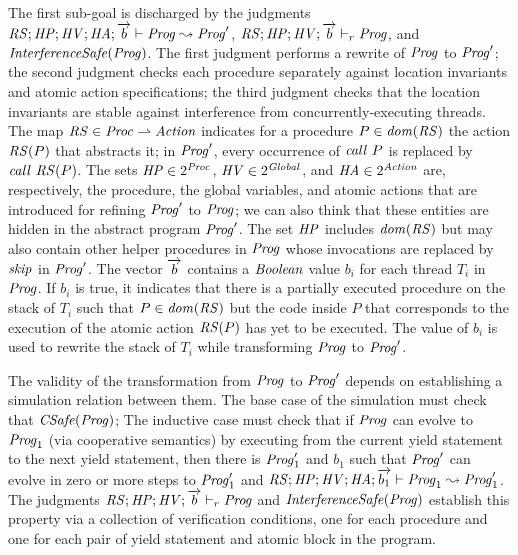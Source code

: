 The first sub-goal is discharged by 
the judgments $\mathit{RS};\mathit{HP};\mathit{HV};\mathit{HA};\overrightarrow{b} \vdash \mathit{Prog} \leadsto \mathit{Prog}'$,
$\mathit{RS};\mathit{HP};\mathit{HV};\overrightarrow{b} \vdash_r \mathit{Prog}$, and $\mathit{InterferenceSafe}(\mathit{Prog})$.
The first judgment performs a rewrite of $\mathit{Prog}$ to $\mathit{Prog}'$;
the second judgment checks each procedure separately against location invariants and atomic action specifications;
the third judgment checks that the location invariants are stable against interference from concurrently-executing threads.
The map $\mathit{RS} \in \mathit{Proc} \rightharpoonup \mathit{Action}$ indicates for a procedure $P \in \mathit{dom}(\mathit{RS})$ 
the action $\mathit{RS}(P)$ that abstracts it;
in $\mathit{Prog}'$, every occurrence of $\mathit{call}\ P$ is replaced by $\mathit{call}\ \mathit{RS}(P)$.
The sets $\mathit{HP} \in 2^{\mathit{Proc}}$, $\mathit{HV} \in 2^{\mathit{Global}}$, and $\mathit{HA} \in 2^{\mathit{Action}}$ 
are, respectively, the procedure, the global variables, and atomic actions 
that are introduced for refining $\mathit{Prog}'$ to $\mathit{Prog}$;
we can also think that these entities are hidden in the abstract program $\mathit{Prog}'$.
The set $\mathit{HP}$ includes $\mathit{dom}(\mathit{RS})$ but may also contain other helper procedures in $\mathit{Prog}$ whose invocations 
are replaced by $\mathit{skip}$ in $\mathit{Prog}'$.
The vector $\overrightarrow{b}$ contains a $\mathit{Boolean}$ value $b_i$ for each thread $T_i$ in $\mathit{Prog}$.
If $b_i$ is true, it indicates that there is a partially executed procedure on the stack of $T_i$ 
such that $P \in \mathit{dom}(\mathit{RS})$ but the code inside $P$ that corresponds to the execution of the atomic action $\mathit{RS}(P)$
has yet to be executed.
The value of $b_i$ is used to rewrite the stack of $T_i$ while transforming $\mathit{Prog}$ to $\mathit{Prog}'$.

The validity of the transformation from $\mathit{Prog}$ to $\mathit{Prog}'$ depends on establishing a simulation relation between them.
The base case of the simulation must check that $\mathit{CSafe}(\mathit{Prog})$;
The inductive case must check that if $\mathit{Prog}$ can evolve to $\mathit{Prog}_1$ (via cooperative semantics)
by executing from the current yield statement to the next yield statement, 
then there is $\mathit{Prog}'_1$ and $b_1$ such that $\mathit{Prog}'$ can evolve in zero or more steps to $\mathit{Prog}'_1$ 
and $\mathit{RS};\mathit{HP};\mathit{HV};\mathit{HA};\overrightarrow{b_1} \vdash \mathit{Prog}_1 \leadsto \mathit{Prog}'_1$.
The judgments $\mathit{RS};\mathit{HP};\mathit{HV};\overrightarrow{b} \vdash_r \mathit{Prog}$ and $\mathit{InterferenceSafe}(\mathit{Prog})$ 
establish this property via a collection of verification conditions, one for each procedure and 
one for each pair of yield statement and atomic block in the program.

